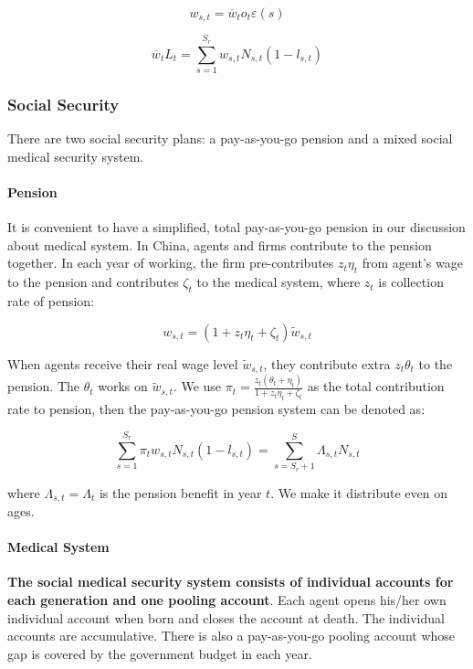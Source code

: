 \[w_{s,t} = {\overline{w}}_{t}o_{t}\varepsilon\left( s \right)\]

\[{\overline{w}}_{t}L_{t} = \sum_{s = 1}^{S_{r}}{w_{s,t}N_{s,t}\left( 1 - l_{s,t} \right)}\]

\hypertarget{social-security}{%
\subsubsection{Social Security}\label{social-security}}

There are two social security plans: a pay-as-you-go pension and a mixed
social medical security system.

\hypertarget{pension}{%
\paragraph{Pension}\label{pension}}

It is convenient to have a simplified, total pay-as-you-go pension in
our discussion about medical system. In China, agents and firms
contribute to the pension together. In each year of working, the firm
pre-contributes \(z_{t}\eta_{t}\) from agent's wage to the pension and
contributes \(\zeta_{t}\) to the medical system, where \(z_{t}\) is
collection rate of pension:

\[w_{s,t} = \left( 1 + z_{t}\eta_{t} + \zeta_{t} \right){\widetilde{w}}_{s,t}\]

When agents receive their real wage level \({\widetilde{w}}_{s,t}\),
they contribute extra \(z_{t}\theta_{t}\) to the pension. The
\(\theta_{t}\) works on \({\widetilde{w}}_{s,t}\). We use
\(\pi_{t} = \frac{z_{t}\left( \theta_{t} + \eta_{t} \right)}{1 + z_{t}\eta_{t} + \zeta_{t}}\)
as the total contribution rate to pension, then the pay-as-you-go
pension system can be denoted as:

\[\sum_{s = 1}^{S_{r}}{\pi_{t}w_{s,t}N_{s,t}\left( 1 - l_{s,t} \right)} = \sum_{s = S_{r} + 1}^{S}{\Lambda_{s,t}N_{s,t}}\]

where \(\Lambda_{s,t} = \Lambda_{t}\) is the pension benefit in year
\(t\). We make it distribute even on ages.

\hypertarget{medical-system}{%
\paragraph{Medical System}\label{medical-system}}

\textbf{The social medical security system consists of individual
accounts for each generation and one pooling account}. Each agent opens
his/her own individual account when born and closes the account at
death. The individual accounts are accumulative. There is also a
pay-as-you-go pooling account whose gap is covered by the government
budget in each year.

